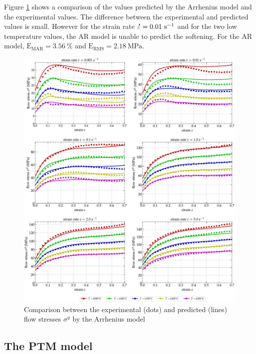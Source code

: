 \documentclass[metals,article,submit,pdftex,moreauthors]{Definitions/mdpi}
\DeclareRobustCommand{\mdot}[1]{\accentset{\mbox{\bfseries .}}{#1}}
\DeclareRobustCommand{\RMSE}{\text{E}_\text{RMS}}
\DeclareRobustCommand{\MARE}{\text{E}_\text{MAR}}
\DeclareRobustCommand{\ps}{\text{s}^{-1}}
\DeclareRobustCommand{\MPa}{\text{MPa}}
\begin{document}
Figure \ref{fig:CompExp-AR-6} shows a comparison of the values predicted by the Arrhenius model and the experimental values.
The difference between the experimental and predicted values is small.
However for the strain rate $\mdot\varepsilon = 0.01~\ps$ and for the two low temperature values, the AR model is unable to predict the softening.
For the AR model, $\MARE=3.56~\%$ and $\RMSE=2.18~\MPa$.
\begin{figure}[!ht]
\centering
\includegraphics[width=\columnwidth]
{Figures/CompExp-AR-6}
\caption{Comparison between the experimental (dots) and predicted (lines) flow stresses $\sigma^y$ by the Arrhenius model}
\label{fig:CompExp-AR-6}
\end{figure}

\subsection{The PTM model\label{sec:PTM}}
\end{document}
